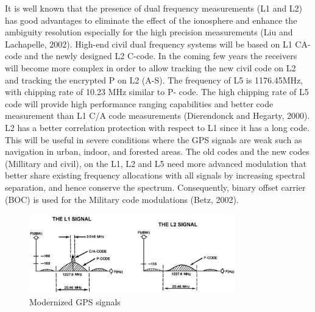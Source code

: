 It is well known that the presence of dual frequency measurements (L1 and L2) has good
advantages to eliminate the effect of the ionosphere and enhance the ambiguity resolution
especially for the high precision measurements (Liu and Lachapelle, 2002). High-end civil dual
frequency systems will be based on L1 CA-code and the newly designed L2 C-code. In the
coming few years the receivers will become more complex in order to allow tracking the new
civil code on L2 and tracking the encrypted P on L2 (A-S).
The frequency of L5 is 1176.45MHz, with chipping rate of 10.23 MHz similar to P- code. The
high chipping rate of L5 code will provide high performance ranging capabilities and better code
measurement than L1 C/A code measurements (Dierendonck and Hegarty, 2000).
L2 has a better correlation protection with respect to L1 since it has a long code. This will be
useful in severe conditions where the GPS signals are weak such as navigation in urban, indoor,
and forested areas.
The old codes and the new codes (Millitary and civil), on the L1, L2 and L5 need more
advanced modulation that better share existing frequency allocations with all signals by
increasing spectral separation, and hence conserve the spectrum. Consequently, binary offset
carrier (BOC) is used for the Military code modulations (Betz, 2002).

\begin{figure}[htb] 
	\label{fig:modernized_gps_signal}
	\centering
	\includegraphics[width=0.8\textwidth]{figures/modernized_gps_signal}
	\caption{Modernized GPS signals}
\end{figure}

